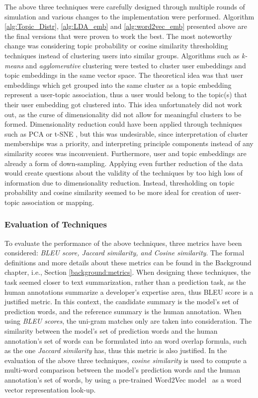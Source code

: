         The above three techniques were carefully designed through multiple rounds of simulation and various changes to the implementation were performed. Algorithm \ref{alg:Topic_Distr}, \ref{alg:LDA_emb} and \ref{alg:word2vec_emb} presented above are the final versions that were proven to work the best. The most noteworthy change was considering topic probability or cosine similarity thresholding techniques instead of clustering users into similar groups. Algorithms such as \emph{k-means} and \emph{agglomerative} clustering were tested to cluster user embeddings and topic embeddings in the same vector space. The theoretical idea was that user embeddings which get grouped into the same cluster as a topic embedding represent a user-topic association, thus a user would belong to the topic(s) that their user embedding got clustered into. This idea unfortunately did not work out, as the curse of dimensionality did not allow for meaningful clusters to be formed. Dimensionality reduction could have been applied through techniques such as PCA \cite{jolliffe1986principal} or t-SNE \cite{maaten2008visualizing}, but this was undesirable, since interpretation of cluster memberships was a priority, and interpreting principle components instead of any similarity scores was inconvenient. Furthermore, user and topic embeddings are already a form of down-sampling. Applying even further reduction of the data would create questions about the validity of the techniques by too high loss of information due to dimensionality reduction. Instead, thresholding on topic probability and cosine similarity seemed to be more ideal for creation of user-topic association or mapping.
        
       \subsubsection{Evaluation of Techniques \label{sec:eval_expertise_prediction}} 
           To evaluate the performance of the above techniques, three metrics have been considered: \emph{BLEU score, Jaccard similarity, and Cosine similarity}. The formal definitions and more details about these metrics can be found in the Background chapter, i.e., Section \ref{background:metrics}. When designing these techniques, the task seemed closer to text summarization, rather than a prediction task, as the human annotations summarize a developer's expertise area, thus BLEU score is a justified metric. In this context, the candidate summary is the model's set of prediction words, and the reference summary is the human annotation. When using \emph{BLEU scores}, the uni-gram matches only are taken into consideration. The similarity between the model's set of prediction words and the human annotation's set of words can be formulated into an word overlap formula, such as the one \emph{Jaccard similarity} has, thus this metric is also justified. In the evaluation of the above three techniques, \emph{cosine similarity} is used to compute a multi-word comparison between the model's prediction words and the human annotation's set of words, by using a pre-trained Word2Vec model~\cite{efstathiou2018word} as a word vector representation look-up.
           
